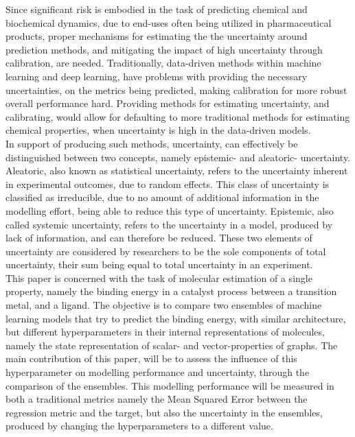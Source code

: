 Since significant risk is embodied in the task of predicting chemical and biochemical dynamics, due to end-uses often being
utilized in pharmaceutical products, proper mechanisms for estimating the the uncertainty around prediction methods, and
mitigating the impact of high uncertainty through calibration, are needed. Traditionally, data-driven methods within machine
learning and deep learning, have problems with providing the necessary uncertainties, on the metrics being predicted, making
calibration for more robust overall performance hard\cite{Song2019}\cite{Busk2021}\cite{AleatoricAndEpistemic}.
Providing methods for estimating uncertainty, and calibrating, would allow for defaulting to more traditional methods
for estimating chemical properties, when uncertainty is high in the data-driven models\cite{Busk2021}. \\


In support of producing such methods, uncertainty, can effectively be distinguished between two concepts,
namely epistemic- and aleatoric- uncertainty\cite{Busk2021}\cite{AleatoricAndEpistemic}. Aleatoric, also known as statistical
uncertainty, refers to the uncertainty inherent in experimental outcomes, due to random effects. This class of uncertainty is
classified as irreducible, due to no amount of additional information in the modelling effort, being able to reduce this type
of uncertainty\cite{AleatoricAndEpistemic}. Epistemic, also called systemic uncertainty, refers to the uncertainty in a model,
produced by lack of information, and can therefore be reduced. These two elements of uncertainty are considered by researchers
to be the sole components of total uncertainty, their sum being equal to total uncertainty in an
experiment\cite{AleatoricAndEpistemic}.\\

This paper is concerned with the task of molecular estimation of a single property, namely the binding energy in a catalyst process
between a transition metal, and a ligand\cite{Meyer2018}. The objective is to compare two ensembles of machine learning models
that try to predict the binding energy, with similar architecture, but different hyperparameters in their internal representations
of molecules, namely the state representation of scalar- and vector-properties of graphs. The main contribution of this paper,
will be to assess the influence of this hyperparameter on modelling performance and uncertainty, through the comparison of the
ensembles. This modelling performance will be measured in both a traditional metrics namely the Mean Squared Error between the
regression metric and the target, but also the uncertainty in the ensembles, produced by changing the hyperparameters to
a different value. \\

